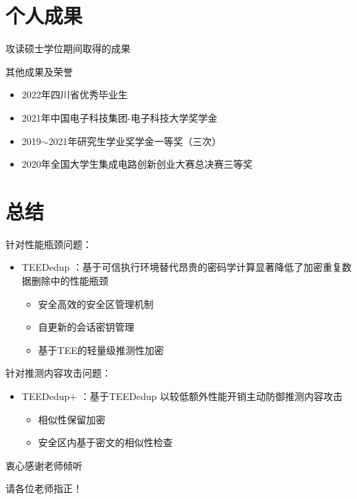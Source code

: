 \documentclass{beamer}
\newcommand{\sysnameS}{TEEDedup }
\newcommand{\prototype}{TEEDedup+ }
\begin{document}
\section{个人成果}

\begin{frame}[allowframebreaks]{攻读硕士学位期间取得的成果}
    \newcommand{\bstlabelmark}{lo}
    \nocite{*}
    
    
    \begin{textbox}{其他成果及荣誉}
        \begin{itemize}
            \item 2022年四川省优秀毕业生
            \item 2021年中国电子科技集团-电子科技大学奖学金
            \item 2019$\sim$2021年研究生学业奖学金一等奖（三次）
            \item 2020年全国大学生集成电路创新创业大赛总决赛三等奖
        \end{itemize}
    \end{textbox}
\end{frame}

\section{总结}

\begin{frame}{}
    \begin{textbox}{针对性能瓶颈问题：}
        \begin{itemize}
            \item \sysnameS ：基于可信执行环境替代昂贵的密码学计算显著降低了加密重复数据删除中的性能瓶颈
                  \begin{itemize}
                      \item 安全高效的安全区管理机制
                      \item 自更新的会话密钥管理
                      \item 基于TEE的轻量级推测性加密
                  \end{itemize}
        \end{itemize}
    \end{textbox}
    \begin{textbox}{针对推测内容攻击问题：}
        \begin{itemize}
            \item \prototype ：基于\sysnameS 以较低额外性能开销主动防御推测内容攻击
                  \begin{itemize}
                      \item 相似性保留加密
                      \item 安全区内基于密文的相似性检查
                  \end{itemize}
        \end{itemize}
    \end{textbox}
\end{frame}

\begin{frame}
    \begin{center}
        {\Huge 衷心感谢老师倾听}

        {\Huge 请各位老师指正！}
    \end{center}
\end{frame}
\end{document}
